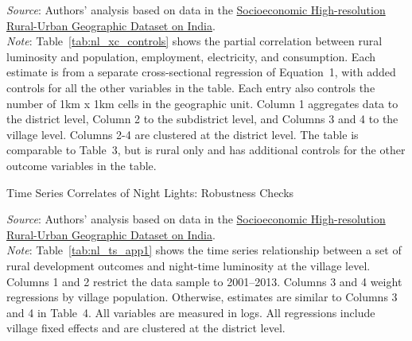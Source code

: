 \documentclass[12pt,letterpaper]{article}
\newcommand{\shrugpath}{.}
\begin{document}
\begin{appendix}
\begin{table}[H]
  \begin{center}
    \footnotesize{}
  \end{center}
  \footnotesize \textit{Source}: Authors' analysis based on data in the \href{http://www.devdatalab.org/shrug}{Socioeconomic High-resolution
    Rural-Urban Geographic Dataset on India}. \\
  \footnotesize \textit{Note}: Table~\ref{tab:nl_xc_controls} shows the partial
  correlation between rural luminosity and population, employment,
  electricity, and consumption. Each estimate is from a separate
  cross-sectional regression of Equation~1, with added
  controls for all the other variables in the table. Each entry also
  controls the number of 1km x 1km cells in the geographic
  unit. Column 1 aggregates data to the district level, Column 2 to
  the subdistrict level, and Columns 3 and 4 to the village
  level. Columns 2-4 are clustered at the district level. The table is
  comparable to Table~3, but is rural only and has additional controls
  for the other outcome variables in the table. 
  \label{tab:nl_xc_controls}
\end{table}


\begin{table}[H]
  \caption{Time Series Correlates of Night Lights: Robustness Checks} 
  
  \begin{center}
    \footnotesize{}
  \end{center}
  \footnotesize \textit{Source}: Authors' analysis based on data in the \href{http://www.devdatalab.org/shrug}{Socioeconomic High-resolution
    Rural-Urban Geographic Dataset on India}. \\
  \footnotesize \textit{Note}: Table~\ref{tab:nl_ts_app1} shows the time series
  relationship between a set of rural development outcomes and
  night-time luminosity at the village level. Columns 1 and 2 restrict
  the data sample to 2001--2013. Columns 3 and 4 weight regressions by
  village population. Otherwise, estimates are similar to Columns 3
  and 4 in Table~4. All variables are measured in
  logs. All regressions include village fixed effects and are
  clustered at the district level.
  \label{tab:nl_ts_app1}
\end{table}


\end{appendix}
\end{document}
